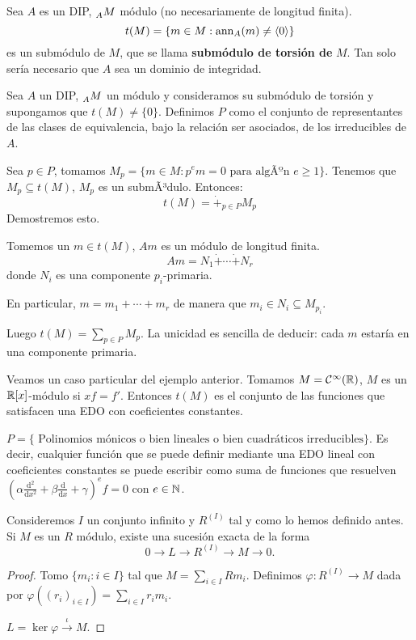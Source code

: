 \begin{cor}
  Sea \(A\) es un DIP, \(\prescript{}{A}{M}\) módulo (no necesariamente de longitud
  finita).
  \[
    t(M)=\{m\in M:\operatorname{ann}_A(m)\neq\langle 0\rangle\}
  \]
  es un submódulo de \(M\), que se llama \textbf{submódulo de torsión de} \(M\).
  Tan solo sería necesario que \(A\) sea un dominio de integridad.
\end{cor}

\begin{ejemplo}
  Sea \(A\) un DIP, \(\prescript{}{A}{M}\) un módulo y consideramos
  su submódulo de torsión y supongamos que \(t(M)\neq\{0\}\).
  Definimos \(P\) como el conjunto de representantes de las clases de
  equivalencia, bajo la relación ser asociados, de los irreducibles de \(A\).

  Sea \(p\in P\), tomamos \(M_p=\{m\in M: p^e m=0\textrm{ para algÃºn }
  e\ge 1\}\). Tenemos que \(M_p\subseteq t(M)\), \(M_p\) es un submÃ³dulo.
  Entonces:
  \[
    t(M)=\dot{+}_{p\in P} M_p
  \]
  Demostremos esto.

  Tomemos un \(m\in t(M)\), \(Am\) es un módulo de longitud finita.
  \[
    Am=N_1\dot{+}\cdots\dot{+}N_r
  \] donde \(N_i\) es una componente \(p_i\)-primaria.

  En particular, \(m=m_1+\cdots+ m_r\) de manera que \(m_i\in N_i\subseteq
  M_{p_i}\).

  Luego \(t(M) = \sum_{p\in P} M_p\). La unicidad es sencilla de deducir:
  cada \(m\) estaría en una componente primaria.
\end{ejemplo}

\begin{ejemplo}
  Veamos un caso particular del ejemplo anterior.
  Tomamos \(M=\mathcal{C}^\infty(\mathbb{R})\), \(M\) es un
  \(\mathbb{R}[x]\)-módulo si \(xf=f'\). Entonces \(t(M)\) es el conjunto
  de las funciones que satisfacen una EDO con coeficientes constantes.

  \(P=\{\textrm{ Polinomios mónicos o bien lineales o bien
    cuadráticos irreducibles}\}\). Es decir, cualquier función que se puede
  definir mediante una EDO lineal con coeficientes constantes se puede
  escribir como suma de funciones que resuelven
  \({(\alpha\frac{\textrm{d}^2}{\textrm{d}x^2}+
    \beta\frac{\textrm{d}}{\textrm{d}x}+\gamma)}^e f=0\) con \(e\in\mathbb{N}\).
\end{ejemplo}

\begin{lema}
  Consideremos \(I\) un conjunto infinito y \(R^{(I)}\) tal y como lo hemos
  definido antes.
  Si \(M\) es un \(R\) módulo, existe una sucesión exacta de la forma
  \[
    0\longrightarrow L\longrightarrow R^{(I)}\longrightarrow M
    \longrightarrow 0.
  \]
\end{lema}
\begin{proof}
  Tomo \(\{m_i:i\in I\}\) tal que \(M=\sum_{i\in I}Rm_i\).
  Definimos \(\varphi:R^{(I)}\longrightarrow M\) dada por
  \(\varphi({(r_i)}_{i\in I})=\sum_{i\in I}r_i m_i\).

  \(L=\ker\varphi\overset{\iota}{\longrightarrow} M\).
\end{proof}

